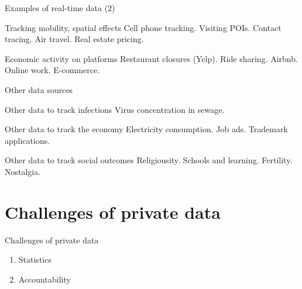\documentclass[
  ignorenonframetext,
  aspectratio=1610,
]{beamer}
\providecommand{\tightlist}{%
  \setlength{\itemsep}{0pt}\setlength{\parskip}{0pt}}
\begin{document}
\begin{frame}{Examples of real-time data (2)}
\protect\hypertarget{examples-of-real-time-data-2}{}
\begin{block}{Tracking mobility, spatial effects}
\protect\hypertarget{tracking-mobility-spatial-effects}{}
Cell phone tracking. Visiting POIs. Contact tracing. Air travel. Real
estate pricing.
\end{block}

\begin{block}{Economic activity on platforms}
\protect\hypertarget{economic-activity-on-platforms}{}
Restaurant closures (Yelp). Ride sharing. Airbnb. Online work.
E-commerce.
\end{block}
\end{frame}

\begin{frame}{Other data sources}
\protect\hypertarget{other-data-sources}{}
\begin{block}{Other data to track infections}
\protect\hypertarget{other-data-to-track-infections}{}
Virus concentration in sewage.
\end{block}

\begin{block}{Other data to track the economy}
\protect\hypertarget{other-data-to-track-the-economy}{}
Electricity consumption. Job ads. Trademark applications.
\end{block}

\begin{block}{Other data to track social outcomes}
\protect\hypertarget{other-data-to-track-social-outcomes}{}
Religiousity. Schools and learning. Fertility. Nostalgia.
\end{block}
\end{frame}

\hypertarget{challenges-of-private-data}{%
\section{Challenges of private data}\label{challenges-of-private-data}}

\begin{frame}{Challenges of private data}
\protect\hypertarget{challenges-of-private-data-1}{}
\begin{enumerate}
\tightlist
\item
  Statistics
\item
  Accountability
\end{enumerate}
\end{frame}
\end{document}
